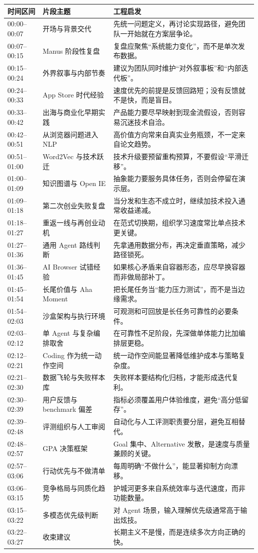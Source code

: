 \documentclass[a4paper]{article}
\begin{document}
\begin{longtable}{p{2.6cm}p{4.0cm}p{6.6cm}}
\toprule
时间区间 & 片段主题 & 工程启发 \\
\midrule
\endhead
00:00--00:07 & 开场与背景交代 & 先统一问题定义，再讨论实现路径，避免团队一开始就在方案层争论。 \\
00:07--00:15 & Manus 阶段性复盘 & 复盘应聚焦“系统能力变化”，而不是单次发布数据。 \\
00:15--00:24 & 外界叙事与内部节奏 & 建议为团队同时维护“对外叙事板”和“内部迭代板”。 \\
00:24--00:33 & App Store 时代经验 & 速度优先的前提是反馈回路短；没有反馈就不是快，而是盲目。 \\
00:33--00:42 & 出海与商业化早期实践 & 产品能力要尽早映射到现金流假设，否则容易沉迷技术自洽。 \\
00:42--00:51 & 从浏览器问题进入 NLP & 高价值方向常来自真实业务瓶颈，不一定来自论文趋势。 \\
00:51--01:00 & Word2Vec 与技术跃迁 & 技术升级要预留重构预算，不要假设“平滑迁移”。 \\
01:00--01:09 & 知识图谱与 Open IE & 抽象能力要服务具体任务，否则会停留在演示层。 \\
01:09--01:18 & 第二次创业失败复盘 & 当分发和生态不成立时，继续加技术投入通常收益递减。 \\
01:18--01:27 & 重返一线与再创业动机 & 在范式切换期，组织学习速度常比单点技术更关键。 \\
01:27--01:36 & 通用 Agent 路线判断 & 先拿通用数据分布，再决定垂直策略，减少路径锁死。 \\
01:36--01:45 & AI Browser 试错经验 & 如果核心矛盾来自容器形态，应尽早换容器而非做局部补丁。 \\
01:45--01:54 & 长尾价值与 Aha Moment & 把长尾任务当“能力压力测试”，而不是当边缘需求。 \\
01:54--02:03 & 沙盒架构与执行环境 & 可观测和可回放是长任务可靠性的必要条件。 \\
02:03--02:12 & 单 Agent 与复杂编排取舍 & 在可靠性不足阶段，先深做单体能力比加编排层更稳。 \\
02:12--02:21 & Coding 作为统一动作空间 & 统一动作空间能显著降低维护成本与策略复杂度。 \\
02:21--02:30 & 数据飞轮与失败样本库 & 失败样本要结构化归档，才能形成迭代复利。 \\
02:30--02:39 & 用户反馈与 benchmark 偏差 & 指标必须覆盖用户体验维度，避免“高分低留存”。 \\
02:39--02:48 & 评测组织与人工审阅 & 自动化与人工评测职责要分层，避免互相替代。 \\
02:48--02:57 & GPA 决策框架 & Goal 集中、Alternative 发散，是速度与质量兼顾的关键。 \\
02:57--03:06 & 行动优先与不做清单 & 每周明确“不做什么”，能显著抑制方向漂移。 \\
03:06--03:15 & 竞争格局与同质化趋势 & 护城河更多来自系统效率与迭代速度，而非功能数量。 \\
03:15--03:22 & 多模态优先级判断 & 对 Agent 场景，输入理解优先级通常高于输出炫技。 \\
03:22--03:27 & 收束建议 & 长期主义不是慢，而是连续多次方向正确的快。 \\
\bottomrule
\end{longtable}
\end{document}
